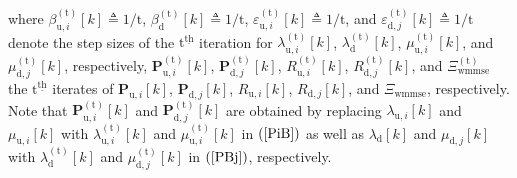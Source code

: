 \documentclass[9pt,journal]{IEEEtran}
\newcommand{\paren}[1]{\left({#1}\right)}
\newcommand{\bracket}[1]{{\left [{#1}\right ]}}
\newcommand{\ith}[1]    {{#1}^{\underline{\text{th}}}}
\newcommand{\PiB}{\mathbf{P}_{\textrm{u},i}\bracket{k}}
\newcommand{\PBj}{\mathbf{P}_{\textrm{d},j}\bracket{k}}
\newcommand{\sfrac}[2]{#1/#2}
\theoremstyle{definition}
\begin{document}
where $\beta^{\paren{\mathrm{t}}}_{\textrm{u},i}\bracket{k}\triangleq\sfrac{1}{\mathrm{t}}$, $\beta^{\paren{\mathrm{t}}}_{\textrm{d}}\bracket{k}\triangleq\sfrac{1}{\mathrm{t}}$, $\varepsilon^{\paren{\mathrm{t}}}_{\textrm{u},i}\bracket{k}\triangleq\sfrac{1}{\mathrm{t}}$, and $\varepsilon^{\paren{\mathrm{t}}}_{\textrm{d},j}\bracket{k}\triangleq\sfrac{1}{\mathrm{t}}$ denote the step sizes of the $\ith{\mathrm{t}}$ iteration for $\lambda^{\paren{\mathrm{t}}}_{\textrm{u},i}\bracket{k}$, $\lambda^{\paren{\mathrm{t}}}_{\textrm{d}}\bracket{k}$, $\mu^{\paren{\mathrm{t}}}_{\textrm{u},i}\bracket{k}$, and $\mu^{\paren{\mathrm{t}}}_{\textrm{d},j}\bracket{k}$, respectively, $\mathbf{P}^{\paren{\mathrm{t}}}_{\textrm{u},i}\bracket{k}$, $\mathbf{P}^{\paren{\mathrm{t}}}_{\textrm{d},j}\bracket{k}$, $\mathit{R}^{\paren{\mathrm{t}}}_{\textrm{u},i}\bracket{k}$, $\mathit{R}^{\paren{\mathrm{t}}}_{\textrm{d},j}\bracket{k}$, and $\Xi^{\paren{\mathrm{t}}}_{\textrm{wmmse}}$ the $\ith{\mathrm{t}}$ iterates of $\PiB$, $\PBj$, $\mathit{R}_{\textrm{u},i}\bracket{k}$, $\mathit{R}_{\textrm{d},j}\bracket{k}$, and $\Xi_{\textrm{wmmse}}$, respectively. Note that $\mathbf{P}^{\paren{\mathrm{t}}}_{\textrm{u},i}\bracket{k}$ and $\mathbf{P}^{\paren{\mathrm{t}}}_{\textrm{d},j}\bracket{k}$ are obtained by replacing $\lambda_{\textrm{u},i}\bracket{k}$ and $\mu_{\textrm{u},i}\bracket{k}$ with $\lambda^{\paren{\mathrm{t}}}_{\textrm{u},i}\bracket{k}$ and $\mu^{\paren{\mathrm{t}}}_{\textrm{u},i}\bracket{k}$ in $\paren{\mathrm{\ref{PiB}}}$ as well as $\lambda_{\textrm{d}}\bracket{k}$ and $\mu_{\textrm{d},j}\bracket{k}$ with $\lambda^{\paren{\mathrm{t}}}_{\textrm{d}}\bracket{k}$ and $\mu^{\paren{\mathrm{t}}}_{\textrm{d},j}\bracket{k}$ in $\paren{\mathrm{\ref{PBj}}}$, respectively. %
\end{document}
